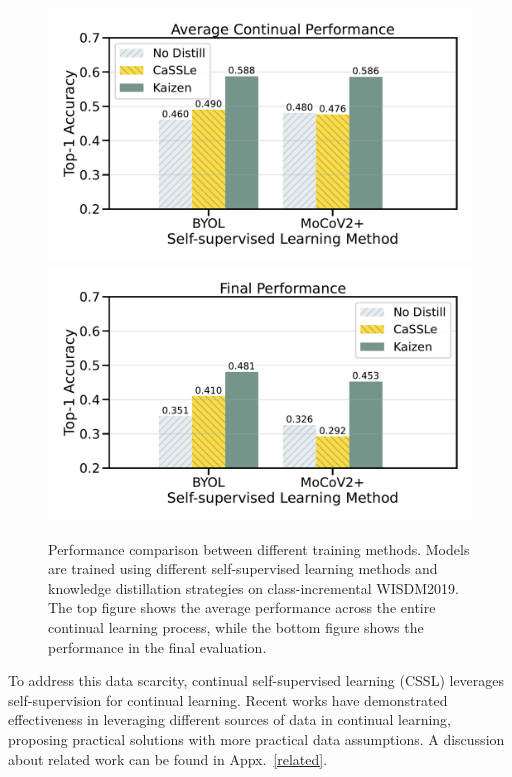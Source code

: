 \begin{figure}[t]
\begin{center}
   \includegraphics[width=0.7\linewidth]{figures_new/Part_1/F1-WISDM2019-6Tasks-Continual_Accuracy-v2.pdf}\\
   \vspace{-0.1in}
   \includegraphics[width=0.7\linewidth]{figures_new/Part_1/F1-WISDM2019-6Tasks-Final_Accuracy-v2.pdf}
   
\end{center}
\vspace{-0.2in}
   \caption{Performance comparison between different training methods. Models are trained using different self-supervised learning methods and knowledge distillation strategies on class-incremental WISDM2019. The top figure shows the average performance across the entire continual learning process, while the bottom figure shows the performance in the final evaluation. 
   }
       \vspace{-0.2in}
   \label{fig:general_performance_comparison}
\end{figure}

To address this data scarcity, continual self-supervised learning (CSSL) leverages self-supervision for continual learning. Recent works \cite{fini2022self, tang2023practical} have demonstrated effectiveness in leveraging different sources of data in continual learning, proposing practical solutions with more practical data assumptions. A discussion about related work can be found in Appx.~\ref{related}.

